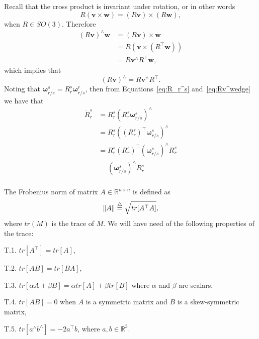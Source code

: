 Recall that the cross product is invariant under rotation, or in other words
\[
R(\mathbf{v}\times\mathbf{w}) = (R\mathbf{v})\times(R\mathbf{w}),
\]
when $R\in SO(3)$.
Therefore
\begin{align*}
(R\mathbf{v})^\wedge\mathbf{w} &= (R\mathbf{v})\times \mathbf{w} \\
&= R\left(\mathbf{v}\times (R^\top \mathbf{w})\right) \\
&= R\mathbf{v}^\wedge R^\top \mathbf{w},
\end{align*}
which implies that
\begin{equation}\label{eq:Rv^wedge}
(R\mathbf{v})^\wedge = R\mathbf{v}^\wedge R^\top.
\end{equation}
Noting that $\boldsymbol{\omega}_{r/s}^s = R_r^s\boldsymbol{\omega}_{r/s}^r$, then from Equations~\eqref{eq:R_r^s} and~\eqref{eq:Rv^wedge} we have that
\begin{align*}
\dot{R}_r^s &= R_r^s(R_r^s\boldsymbol{\omega}_{r/s}^s)^\wedge \\
&= R_r^s((R_r^s)^\top\boldsymbol{\omega}_{r/s}^s)^\wedge \\
&= R_r^s (R_r^s)^\top (\boldsymbol{\omega}_{r/s}^s)^\wedge R_r^s \\
&= (\boldsymbol{\omega}_{r/s}^s)^\wedge R_r^s \\
\end{align*}

The Frobenius norm of matrix $A\in\mathbb{R}^{n\times n}$ is defined as
\[
\left\|A\right\| \stackrel{\triangle}{=} \sqrt{tr[A^\top A]},
\]
where $tr(M)$ is the trace of $M$.  We will have need of the following properties of the trace:
\begin{description}
\item{T.1.} $tr\left[ A^\top \right]=tr\left[ A \right]$,
\item{T.2.} $tr\left[ AB \right] = tr\left[ BA \right]$,
\item{T.3.} $tr\left[ \alpha A + \beta B \right] = \alpha tr\left[ A \right] + \beta tr\left[ B \right]$ where $\alpha$ and $\beta$ are scalars, 
\item{T.4.} $tr\left[ AB \right] = 0$ when $A$ is a symmetric matrix and $B$ is a skew-symmetric matrix,
\item{T.5.} $tr\left[ a^\wedge b^\wedge \right] = -2a^\top b$, where $a, b \in \mathbb{R}^3$.
\end{description}

